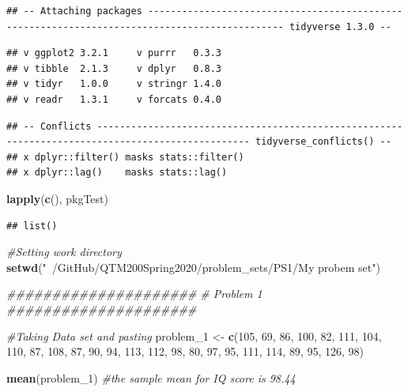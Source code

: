 \documentclass[]{article}
\newenvironment{Shaded}{\begin{snugshade}}{\end{snugshade}}
\newcommand{\CommentTok}[1]{\textcolor[rgb]{0.56,0.35,0.01}{\textit{#1}}}
\newcommand{\DecValTok}[1]{\textcolor[rgb]{0.00,0.00,0.81}{#1}}
\newcommand{\KeywordTok}[1]{\textcolor[rgb]{0.13,0.29,0.53}{\textbf{#1}}}
\newcommand{\NormalTok}[1]{#1}
\newcommand{\StringTok}[1]{\textcolor[rgb]{0.31,0.60,0.02}{#1}}
\begin{document}
\begin{verbatim}
## -- Attaching packages ---------------------------------------------------------------------------------------------- tidyverse 1.3.0 --
\end{verbatim}

\begin{verbatim}
## v ggplot2 3.2.1     v purrr   0.3.3
## v tibble  2.1.3     v dplyr   0.8.3
## v tidyr   1.0.0     v stringr 1.4.0
## v readr   1.3.1     v forcats 0.4.0
\end{verbatim}

\begin{verbatim}
## -- Conflicts ------------------------------------------------------------------------------------------------- tidyverse_conflicts() --
## x dplyr::filter() masks stats::filter()
## x dplyr::lag()    masks stats::lag()
\end{verbatim}

\begin{Shaded}
\begin{Highlighting}[]
\KeywordTok{lapply}\NormalTok{(}\KeywordTok{c}\NormalTok{(),  pkgTest)}
\end{Highlighting}
\end{Shaded}

\begin{verbatim}
## list()
\end{verbatim}

\begin{Shaded}
\begin{Highlighting}[]
\CommentTok{#Setting work directory }
\KeywordTok{setwd}\NormalTok{(}\StringTok{"~/GitHub/QTM200Spring2020/problem_sets/PS1/My probem set"}\NormalTok{)}


\CommentTok{#####################}
\CommentTok{# Problem 1}
\CommentTok{#####################}

\CommentTok{#Taking Data set and pasting}
\NormalTok{problem_}\DecValTok{1}\NormalTok{ <-}\StringTok{ }\KeywordTok{c}\NormalTok{(}\DecValTok{105}\NormalTok{, }\DecValTok{69}\NormalTok{, }\DecValTok{86}\NormalTok{, }\DecValTok{100}\NormalTok{, }\DecValTok{82}\NormalTok{, }\DecValTok{111}\NormalTok{, }\DecValTok{104}\NormalTok{, }\DecValTok{110}\NormalTok{, }\DecValTok{87}\NormalTok{, }\DecValTok{108}\NormalTok{, }\DecValTok{87}\NormalTok{, }\DecValTok{90}\NormalTok{, }\DecValTok{94}\NormalTok{, }\DecValTok{113}\NormalTok{, }\DecValTok{112}\NormalTok{, }\DecValTok{98}\NormalTok{, }\DecValTok{80}\NormalTok{, }\DecValTok{97}\NormalTok{, }\DecValTok{95}\NormalTok{, }\DecValTok{111}\NormalTok{, }\DecValTok{114}\NormalTok{, }\DecValTok{89}\NormalTok{, }\DecValTok{95}\NormalTok{, }\DecValTok{126}\NormalTok{, }\DecValTok{98}\NormalTok{)}

\KeywordTok{mean}\NormalTok{(problem_}\DecValTok{1}\NormalTok{) }\CommentTok{#the sample mean for IQ score is 98.44}
\end{Highlighting}
\end{Shaded}
\end{document}
